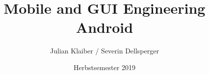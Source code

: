 \documentclass[a4paper,landscape,8pt]{extarticle}
\title{Mobile and GUI Engineering\\\large Android}
\author{Julian Klaiber / Severin Dellsperger}
\date{Herbstsemester 2019}
\affil{Hochschule für Technik Rapperswil}
\begin{document}
\raggedright
\footnotesize
\begin{multicols*}{3}

\setlength{\premulticols}{1pt}
\setlength{\postmulticols}{1pt}
\setlength{\multicolsep}{1pt}
\setlength{\columnsep}{2pt}


%

%







\end{multicols*}
\end{document}
